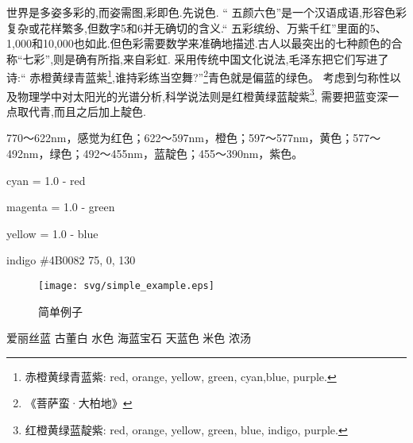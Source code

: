 \documentclass[main.tex]{subfiles}
\begin{document}
世界是多姿多彩的,而姿需图,彩即色.先说色.
“ 五颜六色”是一个汉语成语,形容色彩复杂或花样繁多,但数字5和6并无确切的含义.“ 五彩缤纷、万紫千红”里面的5、1,000和10,000也如此.但色彩需要数学来准确地描述.古人以最突出的七种颜色的合称“七彩”,则是确有所指,来自彩虹.
采用传统中国文化说法,毛泽东把它们写进了诗:“ 赤橙黄绿青蓝紫\footnote{赤橙黄绿青蓝紫: red, orange, yellow, green, cyan,blue, purple.},谁持彩练当空舞?”\footnote{《菩萨蛮·大柏地》}青色就是偏蓝的绿色。
考虑到匀称性以及物理学中对太阳光的光谱分析,科学说法则是红橙黄绿蓝靛紫\footnote{红橙黄绿蓝靛紫: red, orange, yellow, green, blue, indigo, purple.},
需要把蓝变深一点取代青,而且之后加上靛色.

770～622nm，感觉为红色；622～597nm，橙色；597～577nm，黄色；577～492nm，绿色；492～455nm，蓝靛色；455～390nm，紫色。


cyan = 1.0 - red

magenta = 1.0 - green

yellow = 1.0 - blue

indigo \#4B0082 75, 0, 130

\begin{figure}
	\centering
	\texttt{[image: svg/simple\_example.eps]}
	\caption{简单例子}
	\label{fig:I.1.}
\end{figure}



爱丽丝蓝%
古董白%
水色%
海蓝宝石%
天蓝色%
米色%
浓汤%
\end{document}
